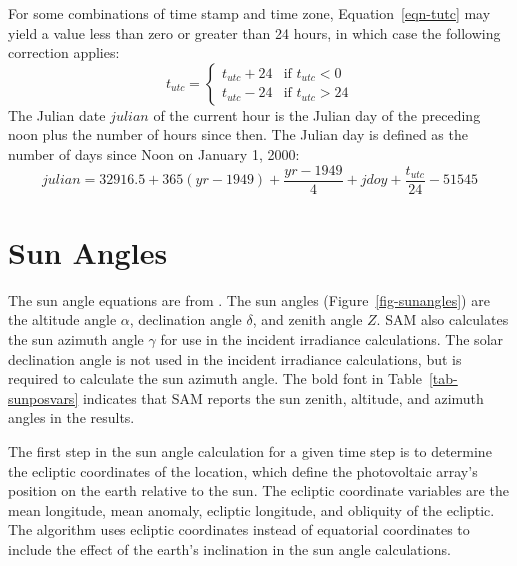 \documentclass[12pt,letterpaper]{article}
\begin{document}
For some combinations of time stamp and time zone, Equation~\ref{eqn-tutc} may yield a value less than zero or greater than 24 hours, in which case the following correction applies:
\begin{equation}
t_{utc} = \left\{
   \begin{array}{ll}
       t_{utc} + 24 & 
      \text{if $t_{utc}<0$}\\
      t_{utc} - 24 & 
      \text{if $t_{utc}>24$}
   \end{array}
\right. 
\end{equation}
The Julian date $\mathit{julian}$ of the current hour is the Julian day of the preceding noon plus the number of hours since then. The Julian day is defined as the number of days since Noon on January 1, 2000:
\begin{equation}\label{eqn-jday}
\mathit{julian} = 32916.5 + 365(\mathit{yr}-1949) + \frac{\mathit{yr}-1949}{4} + \mathit{jdoy} + \frac{t_{utc}}{24} - 51545
\end{equation}

\section{Sun Angles} \label{sec-sunangles}

The sun angle equations are from \citet{michalsky1988}. The sun angles (Figure~\ref{fig-sunangles}) are the altitude angle $\alpha$, declination angle $\delta$, and zenith angle $Z$. SAM also calculates the sun azimuth angle $\gamma$ for use in the incident irradiance calculations. The solar declination angle is not used in the incident irradiance calculations, but is required to calculate the sun azimuth angle. The bold font in Table~\ref{tab-sunposvars} indicates that SAM reports the sun zenith, altitude, and azimuth angles in the results.

The first step in the sun angle calculation for a given time step is to determine the ecliptic coordinates of the location, which define the photovoltaic array's position on the earth relative to the sun. The ecliptic coordinate variables are the mean longitude, mean anomaly, ecliptic longitude, and obliquity of the ecliptic. The algorithm uses ecliptic coordinates instead of equatorial coordinates to include the effect of the earth's inclination in the sun angle calculations.
\end{document}
